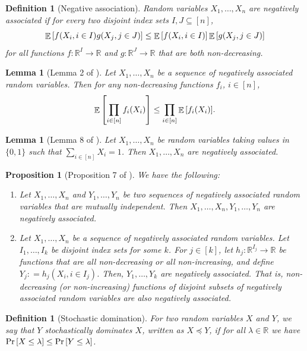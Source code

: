 \documentclass[letterpaper,11pt]{article}
\newtheorem{lemma}[theorem]{Lemma}
\newtheorem{proposition}[theorem]{Proposition}
\newtheorem{definition}[theorem]{Definition}
\def\defeq{\mathrel{\mathop:}=}
\DeclareMathOperator*{\E}{\mathbb{E}}
\newcommand{\binset}{\{0,1 \}}
\begin{document}
\begin{definition}[Negative association]
    \label{def:NA}
    Random variables $X_1,\ldots,X_n$ are \emph{negatively associated} if 
    for every two disjoint index sets $I,J\subseteq [n]$,
    \[
    \E\qty[f(X_i,i\in I)g(X_j,j\in J)]\leq \E\qty[f(X_i,i\in I)]\E\qty[g(X_j,j\in J)]
    \] 
    for all functions $f:\mathbb{R}^I\to \mathbb{R}$ and $g:\mathbb{R}^J\to \mathbb{R}$
    that are both non-decreasing.
\end{definition}
\begin{lemma}[Lemma 2 of \cite{Dubhashi1998-cf}]
    \label{lem:prodict of NA}
    Let $X_1,\ldots,X_n$ be a sequence of negatively associated random variables.
    Then for any non-decreasing functions $f_i$, $i\in [n]$,
    \[
    \E\qty[\prod_{i\in [n]}f_i(X_i)]\leq \prod_{i\in [n]}\E\qty[f_i(X_i)].
    \]
\end{lemma}
\begin{lemma}[Lemma 8 of \cite{Dubhashi1998-cf}]
    \label{lem:zero one lemma}
    Let $X_1,\ldots,X_n$ be random variables taking values in $\binset$ such that $\sum_{i\in[n]}X_i=1$.
    Then $X_1,\ldots,X_n$ are negatively associated.
\end{lemma}
\begin{proposition}[Proposition 7 of \cite{Dubhashi1998-cf}]
    \label{lem:concatination of NA}
    We have the following:
    \begin{enumerate}
        \item Let $X_1,\ldots, X_n$ and $Y_1,\ldots, Y_n$ be two sequences of negatively associated random variables that are mutually independent.
        Then $X_1,\ldots, X_n, Y_1,\ldots, Y_n$ are negatively associated.
        \item Let $X_1,\ldots, X_n$ be a sequence of negatively associated random variables.
        Let $I_1,\ldots, I_k$ be disjoint index sets for some $k$.
        For $j\in [k]$, let $h_j:\mathbb{R}^{I_j}\to \mathbb{R}$ be functions that are all non-decreasing or all non-increasing, and define $Y_j\defeq h_j(X_i,i\in I_j)$.
        Then, $Y_1,\ldots,Y_k$ are negatively associated.
        That is, non-decreasing (or non-increasing) functions of disjoint subsets of negatively associated random variables are also negatively associated.
    \end{enumerate}
\end{proposition}

\begin{definition}[Stochastic domination]
    \label{def:Stochastic domination}
    For two random variables $X$ and $Y$, we say that $Y$ stochastically dominates $X$, written as $X\preceq Y$, if for all $\lambda \in \mathbb{R}$ we have $\Pr\qty[X\leq \lambda]\leq \Pr\qty[Y\leq \lambda]$.
\end{definition}
\end{document}
